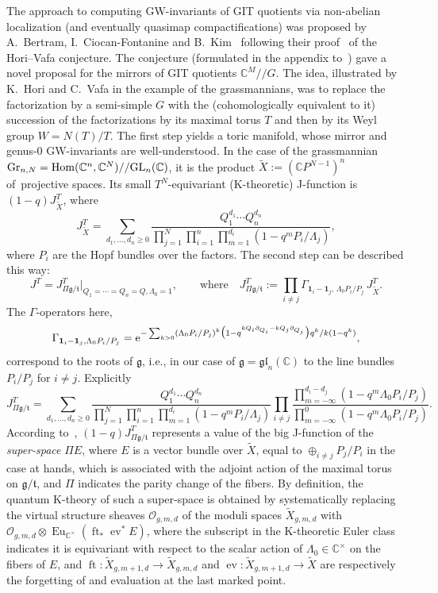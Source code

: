 \documentclass[10pt,a4paper]{amsart}
\numberwithin{equation}{section}
\def\O{\mathcal O}
\def\1{\mathbf 1}
\def\CC{\mathbb C}
\def\tilde{\widetilde}
\def\p{\partial}
\def\ev{\operatorname{ev}}
\def\ft{\operatorname{ft}}
\def\Eu{\operatorname{Eu}}
\theoremstyle{definition}
\theoremstyle{plain}
\begin{document}
The approach to computing GW-invariants of GIT quotients via non-abelian localization (and eventually quasimap compactifications) was proposed by A.~Bertram, I.~Ciocan-Fontanine and B.~Kim~\cite{BCK2} following their proof~\cite{BCK1} of the Hori--Vafa conjecture. The conjecture (formulated in the appendix to~\cite{Hori-Vafa}) gave a novel proposal for the mirrors of GIT quotients $\CC^M//G$. The idea,
illustrated by K.~Hori and C.~Vafa in the example of the grassmannians, was to replace the factorization by a semi-simple $G$ with the (cohomologically equivalent to it) succession of the factorizations by its maximal torus $T$ and then by its Weyl group $W=N(T)/T$. The first step yields a toric manifold, whose mirror and genus-$0$ GW-invariants are well-understood. In the case of the grassmannian ${\rm Gr}_{n,N}=\mathop{\rm Hom}(\CC^n,\CC^N)//{\rm GL}_n(\CC)$, it is the product $\tilde{X}:=(\CC P^{N-1})^n$ of~projective spaces. Its small $T^N$-equivariant (K-theoretic) J-function is $(1-q) J_{\tilde{X}}^T$, where
\[
J^T_{\tilde{X}}=\sum_{d_1,\dots,d_n\geq 0}\frac{Q_1^{d_1}\cdots Q_n^{d_n}}{\prod_{j=1}^N\prod_{i=1}^n\prod_{m=1}^{d_i}(1-q^mP_i/\Lambda_j)},
\]
where $P_i$ are the Hopf bundles over the factors. The second step can be described this way:
\[
J^T=J^T_{\Pi \mathfrak{g}/\mathfrak{t}}|_{Q_1=\cdots=Q_n=Q, \Lambda_0=1}, \qquad \text{where}\quad J^T_{\Pi \mathfrak{g}/\mathfrak{t}}:=\prod_{i\neq j} \Gamma_{\1_i-\1_j,\,\Lambda_0 P_i/P_j} \,J^T_{\tilde{X}}.
\]
The $\Gamma$-operators here,
\[
\Gamma_{\1_i-\1_j, \Lambda_0 P_i/P_j}={\rm e}^{ -\sum_{k>0} (\Lambda_0P_i/P_j)^k\big(1-q^{kQ_i\p_{Q_i}-kQ_j\p_{Q_j}}\big)q^k/k(1-q^k)},
\]
correspond to the roots of $\mathfrak{g}$, i.e., in our case of $\mathfrak{g}=\mathfrak{gl}_n(\CC)$ to the line bundles $P_i/P_j$ for $i\neq j$. Explicitly
\[
J^T_{\Pi \mathfrak{g}/\mathfrak{t}}=\sum_{d_1,\dots,d_n\geq 0}\frac{Q_1^{d_1}\cdots Q_n^{d_n}}{\prod_{j=1}^N\prod_{i=1}^n\prod_{m=1}^{d_i}(1-q^mP_i/\Lambda_j)}
\prod_{i\neq j}\frac{\prod_{m=-\infty}^{d_i-d_j}(1-q^m\Lambda_0P_i/P_j)}{\prod_{m=-\infty}^0
(1-q^m\Lambda_0P_i/P_j)}.
\]
According to~\cite{Givental:perm5}, $(1-q)J^T_{\Pi {\mathfrak{g}/\mathfrak{t}}}$ represents a value of the big J-function of the {\em super-space} $\Pi E$, where $E$ is a vector bundle over $\tilde{X}$, equal to $\oplus_{i\neq j}P_j/P_i$ in the case at hands, which is associated with the adjoint action of the maximal torus on $\mathfrak{g}/\mathfrak{t}$, and $\Pi$ indicates the parity change of the fibers. By definition, the quantum K-theory of such a super-space is obtained by systematically replacing the virtual structure sheaves $\O_{g,m,d}$ of the moduli spaces $\tilde{X}_{g,m,d}$ with $\O_{g,m,d}\otimes \Eu_{\CC^{\times}}(\ft_*\ev^*E)$, where the subscript in the K-theoretic Euler class indicates it is equi\-variant with respect to the scalar action of $\Lambda_0\in \CC^{\times}$ on the fibers of $E$, and $\ft\colon \tilde{X}_{g,m+1,d}\to \tilde{X}_{g,m,d}$ and $\ev\colon \tilde{X}_{g,m+1,d}\to \tilde{X}$ are respectively the forgetting of and evaluation at the last marked point.
\end{document}
